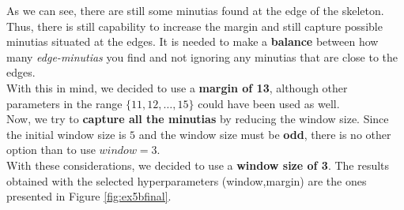 \documentclass[a4paper]{article}
\begin{document}
As we can see, there are still some minutias found at the edge of the skeleton. Thus, there is still capability to increase the margin and still capture possible minutias situated at the edges. It is needed to make a \textbf{balance} between how many \emph{edge-minutias} you find and not ignoring any minutias that are close to the edges. \\

With this in mind, we decided to use a \textbf{margin of 13}, although other parameters in the range \(\{11,12,\dots,15\}\) could have been used as well.\\

Now, we try to \textbf{capture all the minutias} by reducing the window size. Since the initial window size is \(5\) and the window size must be \textbf{odd}, there is no other option than to use \(window = 3\).\\

With these considerations, we decided to use a \textbf{window size of 3}. The results obtained with the selected hyperparameters (window,margin) are the ones presented in Figure \ref{fig:ex5bfinal}.
\end{document}
